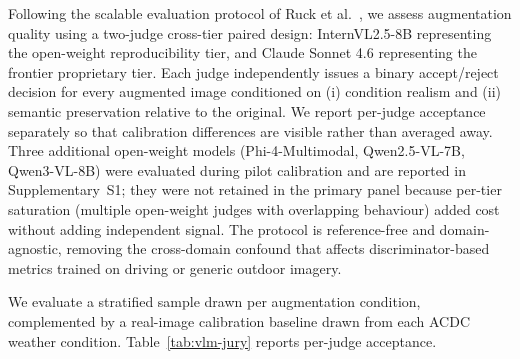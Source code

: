 \documentclass[12pt]{article}
\begin{document}
Following the scalable evaluation protocol of Ruck et al.~\citep{ruck2026scalable}, we assess augmentation quality using a two-judge cross-tier paired design: InternVL2.5-8B representing the open-weight reproducibility tier, and Claude Sonnet 4.6 representing the frontier proprietary tier. Each judge independently issues a binary accept/reject decision for every augmented image conditioned on (i) condition realism and (ii) semantic preservation relative to the original. We report per-judge acceptance separately so that calibration differences are visible rather than averaged away. Three additional open-weight models (Phi-4-Multimodal, Qwen2.5-VL-7B, Qwen3-VL-8B) were evaluated during pilot calibration and are reported in Supplementary~S1; they were not retained in the primary panel because per-tier saturation (multiple open-weight judges with overlapping behaviour) added cost without adding independent signal. The protocol is reference-free and domain-agnostic, removing the cross-domain confound that affects discriminator-based metrics trained on driving or generic outdoor imagery.

We evaluate a stratified sample drawn per augmentation condition, complemented by a real-image calibration baseline drawn from each ACDC weather condition. Table~\ref{tab:vlm-jury} reports per-judge acceptance.
\end{document}
